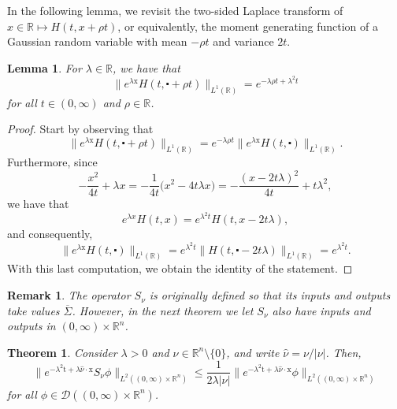 \documentclass[10pt,a4paper]{amsart}
\newtheorem{theorem}[proposition]{Theorem}
\newtheorem{lemma}[proposition]{Lemma}
\newtheorem{remark}[proposition]{Remark}
\newcommand{\R}{\mathbb{R}}
\newcommand{\tm}{\mathrm{t}}
\newcommand{\x}{\mathrm{x}}
\begin{document}
In the following lemma, we revisit the two-sided Laplace transform of 
$x \in \R \mapsto H(t, x + \rho t)$, or equivalently, 
the moment generating function of a Gaussian random variable
with mean $-\rho t$ and variance $2t$.
\begin{lemma}\label{lem:heat-exponential}\sl
For $\lambda \in \R$, we have that
\[ \| e^{\lambda \x} H(t, \centerdot + \rho t) \|_{L^1(\R)} = e^{-\lambda\rho t + \lambda^2 t} \]
for all $t \in (0, \infty)$ and $\rho \in \R$.
\end{lemma}

\begin{proof}
Start by observing that
\[ \| e^{\lambda \x} H(t, \centerdot + \rho t) \|_{L^1(\R)} = e^{- \lambda \rho t} \| e^{\lambda \x} H(t, \centerdot) \|_{L^1(\R)}. \]
Furthermore, since
\[-\frac{x^2}{4t} + \lambda x = - \frac{1}{4t} \Big( x^2 - 4t \lambda x \Big) = - \frac{(x-2t\lambda)^2}{4t} + t \lambda^2, \]
we have that
\[ e^{\lambda x} H(t, x) = e^{\lambda^2t} H(t, x - 2t\lambda), \]
and consequently,
\[ \| e^{\lambda \x} H(t, \centerdot) \|_{L^1(\R)} = e^{\lambda^2t} \| H(t, \centerdot - 2t\lambda) \|_{L^1(\R)} = e^{\lambda^2t}. \]
With this last computation, we obtain the identity of the statement.
\end{proof}

\begin{remark} The operator $S_\nu$ is originally defined so that its inputs and outputs take values $\overline{\Sigma}$. However, in the next theorem we let $S_\nu$ also have
inputs and outputs in $(0, \infty) \times \R^n$.
\end{remark}


\begin{theorem}\label{thm:key-inequality}\sl Consider $\lambda > 0$ and $\nu \in \R^n \setminus\{ 0 \}$, and
write $\hat{\nu} = \nu/|\nu|$.
Then, 
\[\| e^{-\lambda^2 \tm + \lambda \hat{\nu} \cdot \x} S_\nu \phi \|_{L^2((0, \infty) \times \R^n)} \leq \frac{1}{2 \lambda |\nu|} \| e^{-\lambda^2 \tm + \lambda \hat{\nu} \cdot \x} \phi \|_{L^2((0, \infty) \times \R^n)} \]
for all $\phi \in \mathcal{D}((0, \infty) \times \R^n)$.
\end{theorem}
\end{document}
